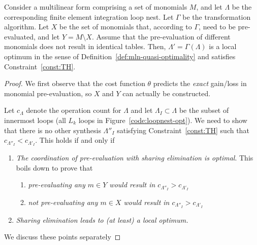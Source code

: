 \begin{Prop}
\label{prop:optimal-approach}
Consider a multilinear form comprising a set of monomials $M$, and let $\Lambda$ be the corresponding finite element integration loop nest. Let $\Gamma$ be the transformation algorithm. Let $X$ be the set of monomials that, according to $\Gamma$, need to be pre-evaluated, and let $Y = M \setminus X$. Assume that the pre-evaluation of different monomials does not result in identical tables. Then, $\Lambda' = \Gamma(\Lambda)$ is a local optimum in the sense of Definition~\ref{def:mln-quasi-optimality} and satisfies Constraint~\ref{const:TH}.
\end{Prop}
\begin{proof}
We first observe that the cost function $\theta$ predicts the \textit{exact} gain/loss in monomial pre-evaluation, so $X$ and $Y$ can actually be constructed.

Let $c_\Lambda$ denote the operation count for $\Lambda$ and let $\Lambda_I \subset \Lambda$ be the subset of innermost loops (all $L_k$ loops in Figure~\ref{code:loopnest-opt}). We need to show that there is no other synthesis $\Lambda''_{I}$ satisfying Constraint~\ref{const:TH} such that $c_{\Lambda''_I} < c_{\Lambda'_I}$. This holds if and only if
\begin{enumerate}
\item \textit{The coordination of pre-evaluation with sharing elimination is optimal}. This boils down to prove that
\begin{enumerate}
\item \textit{pre-evaluating any $m \in Y$ would result in $c_{\Lambda''_I} > c_{\Lambda'_I}$}
\item \textit{not pre-evaluating any $m \in X$ would result in $c_{\Lambda''_I} > c_{\Lambda'_I}$}
\end{enumerate}
\item \textit{Sharing elimination leads to (at least) a local optimum.}\\
\end{enumerate}

We discuss these points separately


\end{proof}

